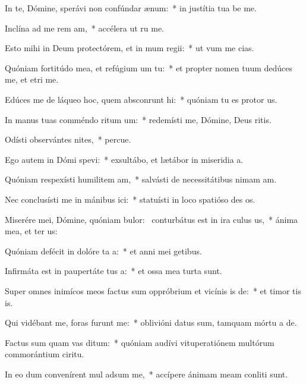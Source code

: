 \item In te, Dómine, sperávi non confúndar  ænum:~* in justítia tua be me.
\item Inclína ad me rem am,~* accélera ut ru me.
\item Esto mihi in Deum protectórem, et in mum regii:~* ut vum me cias.
\item Quóniam fortitúdo mea, et refúgium um  tu:~* et propter nomen tuum dedúces me, et etri me.
\item Edúces me de láqueo hoc, quem absconrunt hi:~* quóniam tu es protor us.
\item In manus tuas comméndo ritum um:~* redemísti me, Dómine, Deus ritis.
\item Odísti observántes nites,~* percue.
\item Ego autem in Dómi spevi:~* exsultábo, et lætábor in miseridia a.
\item Quóniam respexísti humilitem am,~* salvásti de necessitátibus nimam am.
\item Nec conclusísti me in mánibus ici:~* statuísti in loco spatióso des os.
\item Miserére mei, Dómine, quóniam bulor:~\pscross{} conturbátus est in ira culus us,~* ánima mea, et ter us:
\item Quóniam defécit in dolóre ta a:~* et anni mei  getibus.
\item Infirmáta est in paupertáte tus a:~* et ossa mea turta sunt.
\item Super omnes inimícos meos factus sum oppróbrium et vicínis is de:~* et timor tis is.
\item Qui vidébant me, foras furunt  me:~* oblivióni datus sum, tamquam mórtu a de.
\item Factus sum quam vas ditum:~* quóniam audívi vituperatiónem multórum commorántium  ciritu.
\item In eo dum convenírent mul adsum me,~* accípere ánimam meam conliti sunt.
